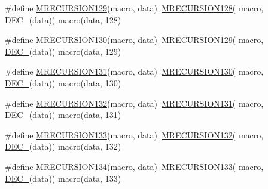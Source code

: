 \begin{DoxyCompactItemize}
\item 
\#define \mbox{\hyperlink{group__group__sam0__utils__mrecursion_gad2b53c67fce0357e4fe34a21d831a002}{M\+R\+E\+C\+U\+R\+S\+I\+O\+N129}}(macro,  data)~\mbox{\hyperlink{group__group__sam0__utils__mrecursion_ga5c2aeada031c5a2154dcff155a117fb8}{M\+R\+E\+C\+U\+R\+S\+I\+O\+N128}}(  macro, \mbox{\hyperlink{group__group__sam0__utils__mrecursion_ga1d23d683797679dca8c3512a54a5dcae}{D\+E\+C\+\_\+}}(data))   macro(data, 128)
\item 
\#define \mbox{\hyperlink{group__group__sam0__utils__mrecursion_ga64d79abf88088b86d3f99df2c575418e}{M\+R\+E\+C\+U\+R\+S\+I\+O\+N130}}(macro,  data)~\mbox{\hyperlink{group__group__sam0__utils__mrecursion_gad2b53c67fce0357e4fe34a21d831a002}{M\+R\+E\+C\+U\+R\+S\+I\+O\+N129}}(  macro, \mbox{\hyperlink{group__group__sam0__utils__mrecursion_ga1d23d683797679dca8c3512a54a5dcae}{D\+E\+C\+\_\+}}(data))   macro(data, 129)
\item 
\#define \mbox{\hyperlink{group__group__sam0__utils__mrecursion_ga7928b50c50f48c1ee87afe5d3d1897d6}{M\+R\+E\+C\+U\+R\+S\+I\+O\+N131}}(macro,  data)~\mbox{\hyperlink{group__group__sam0__utils__mrecursion_ga64d79abf88088b86d3f99df2c575418e}{M\+R\+E\+C\+U\+R\+S\+I\+O\+N130}}(  macro, \mbox{\hyperlink{group__group__sam0__utils__mrecursion_ga1d23d683797679dca8c3512a54a5dcae}{D\+E\+C\+\_\+}}(data))   macro(data, 130)
\item 
\#define \mbox{\hyperlink{group__group__sam0__utils__mrecursion_ga77488df7e435bb14b20305e9c6c19977}{M\+R\+E\+C\+U\+R\+S\+I\+O\+N132}}(macro,  data)~\mbox{\hyperlink{group__group__sam0__utils__mrecursion_ga7928b50c50f48c1ee87afe5d3d1897d6}{M\+R\+E\+C\+U\+R\+S\+I\+O\+N131}}(  macro, \mbox{\hyperlink{group__group__sam0__utils__mrecursion_ga1d23d683797679dca8c3512a54a5dcae}{D\+E\+C\+\_\+}}(data))   macro(data, 131)
\item 
\#define \mbox{\hyperlink{group__group__sam0__utils__mrecursion_ga8470b5ef07ccf697497fb46ced78884e}{M\+R\+E\+C\+U\+R\+S\+I\+O\+N133}}(macro,  data)~\mbox{\hyperlink{group__group__sam0__utils__mrecursion_ga77488df7e435bb14b20305e9c6c19977}{M\+R\+E\+C\+U\+R\+S\+I\+O\+N132}}(  macro, \mbox{\hyperlink{group__group__sam0__utils__mrecursion_ga1d23d683797679dca8c3512a54a5dcae}{D\+E\+C\+\_\+}}(data))   macro(data, 132)
\item 
\#define \mbox{\hyperlink{group__group__sam0__utils__mrecursion_ga340283014fb8ab457e6a67b1549aa8a1}{M\+R\+E\+C\+U\+R\+S\+I\+O\+N134}}(macro,  data)~\mbox{\hyperlink{group__group__sam0__utils__mrecursion_ga8470b5ef07ccf697497fb46ced78884e}{M\+R\+E\+C\+U\+R\+S\+I\+O\+N133}}(  macro, \mbox{\hyperlink{group__group__sam0__utils__mrecursion_ga1d23d683797679dca8c3512a54a5dcae}{D\+E\+C\+\_\+}}(data))   macro(data, 133)

\end{DoxyCompactItemize}
